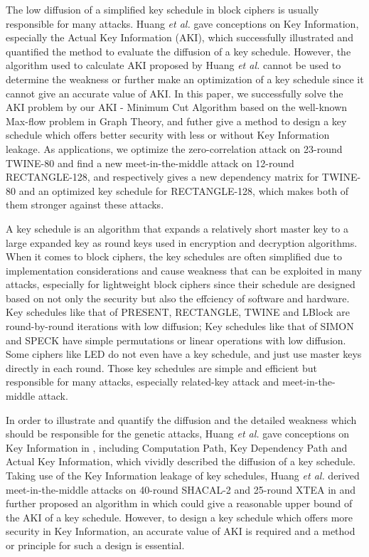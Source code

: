 \begin{bigabstract}
The low diffusion of a simplified key schedule in block ciphers is usually responsible for many attacks.
    Huang \emph{et al.} gave conceptions on Key Information, especially the Actual Key Information (AKI), which successfully illustrated and quantified the method to evaluate the diffusion of a key schedule.
    However, the algorithm used to calculate AKI proposed by Huang \emph{et al.} cannot be used to determine the weakness or further make an optimization of a key schedule since it cannot give an accurate value of AKI.
    In this paper, we successfully solve the AKI problem by our AKI - Minimum Cut Algorithm based on the well-known Max-flow problem in Graph Theory,
    and futher give a method to design a key schedule which offers better security with less or without Key Information leakage.
    As applications, we optimize the zero-correlation attack on 23-round TWINE-80 and find a new meet-in-the-middle attack on 12-round RECTANGLE-128,
    and respectively gives a new dependency matrix for TWINE-80 and an optimized key schedule for RECTANGLE-128, which makes both of them stronger against these attacks.

A key schedule is an algorithm that expands a relatively short master key to a large expanded key as round keys used in encryption and decryption algorithms.
When it comes to block ciphers, the key schedules are often simplified due to implementation considerations and cause weakness that can be exploited in many attacks, especially for lightweight block ciphers since their schedule are designed based on not only the security but also the effciency of software and hardware.
Key schedules like that of PRESENT, RECTANGLE, TWINE and LBlock are round-by-round iterations with low diffusion;
Key schedules like that of SIMON and SPECK have simple permutations or linear operations with low diffusion.
Some ciphers like LED do not even have a key schedule, and just use master keys directly in each round.
Those key schedules are simple and efficient but responsible for many attacks, especially related-key attack and meet-in-the-middle attack.

In order to illustrate and quantify the diffusion and the detailed weakness which should be responsible for the genetic attacks, Huang \emph{et al.} gave conceptions on Key Information in , including Computation Path, Key Dependency Path and Actual Key Information, which vividly described the diffusion of a key schedule. 
Taking use of the Key Information leakage of key schedules, Huang \emph{et al.} derived meet-in-the-middle attacks on 40-round SHACAL-2 and 25-round XTEA in  and further proposed an algorithm in  which could give a reasonable upper bound of the AKI of a key schedule.
However, to design a key schedule which offers more security in Key Information, an accurate value of AKI is required and a method or principle for such a design is essential.


\end{bigabstract}
